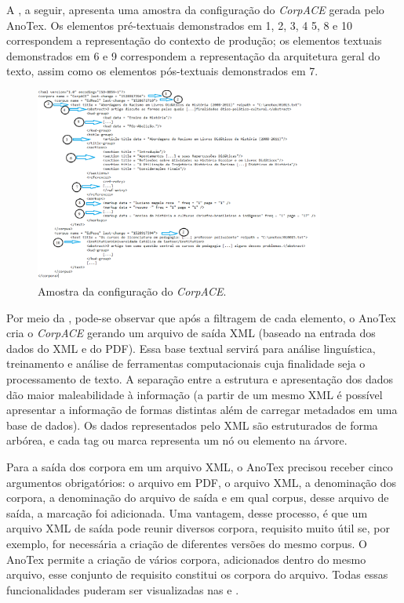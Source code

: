 \documentclass[portuguese]{textolivre}
\begin{document}
A , a seguir, apresenta uma amostra da configuração do \textit{CorpACE} gerada pelo AnoTex. Os elementos pré-textuais demonstrados em 1, 2, 3, 4 5, 8 e 10 correspondem a representação do contexto de produção; os elementos textuais demonstrados em 6 e 9 correspondem a representação da arquitetura geral do texto, assim como os elementos pós-textuais demonstrados em 7.

\begin{figure}[htbp]
 \centering
 \includegraphics[width=0.85\textwidth]{Fig5.png}
 \caption{Amostra da configuração do \textit{CorpACE}.}
 \label{fig-05}
\end{figure}

Por meio da , pode-se observar que após a filtragem de cada elemento, o AnoTex cria o \textit{CorpACE} gerando um arquivo de saída XML (baseado na entrada dos dados do XML e do PDF). Essa base textual servirá para análise linguística, treinamento e análise de ferramentas computacionais cuja finalidade seja o processamento de texto. A separação entre a estrutura e apresentação dos dados dão maior maleabilidade à informação (a partir de um mesmo XML é possível apresentar a informação de formas distintas além de carregar metadados em uma base de dados). Os dados representados pelo XML são estruturados de forma arbórea, e cada tag ou marca representa um nó ou elemento na árvore.

Para a saída dos corpora em um arquivo XML, o AnoTex precisou receber cinco argumentos obrigatórios: o arquivo em PDF, o arquivo XML, a denominação dos corpora, a denominação do arquivo de saída e em qual corpus, desse arquivo de saída, a marcação foi adicionada. Uma vantagem, desse processo, é que um arquivo XML de saída pode reunir diversos corpora, requisito muito útil se, por exemplo, for necessária a criação de diferentes versões do mesmo corpus. O AnoTex permite a criação de vários corpora, adicionados dentro do mesmo arquivo, esse conjunto de requisito constitui os corpora do arquivo. Todas essas funcionalidades puderam ser visualizadas nas  e .
\end{document}
